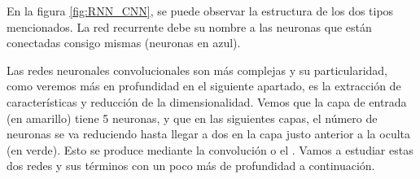 
En la figura \ref{fig:RNN_CNN}, se puede observar la estructura de los dos tipos mencionados. La red recurrente debe su nombre a las neuronas que están conectadas consigo mismas (neuronas en azul).

Las redes neuronales convolucionales son más complejas y su particularidad, como veremos más en profundidad en el siguiente apartado, es la extracción de características y reducción de la dimensionalidad. Vemos que la capa de entrada (en amarillo) tiene 5 neuronas, y que en las siguientes capas, el número de neuronas se va reduciendo hasta llegar a dos en la capa justo anterior a la oculta (en verde). Esto se produce mediante la convolución o el . Vamos a estudiar estas dos redes y sus términos con un poco más de profundidad a continuación.

